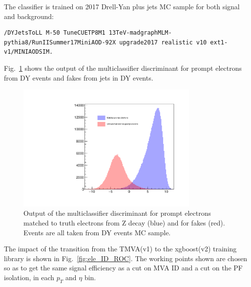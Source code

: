 The classifier is trained on 2017 Drell-Yan plus jets MC sample for both signal and background:
{
\tiny
\begin{verbatim}
/DYJetsToLL M-50 TuneCUETP8M1 13TeV-madgraphMLM-pythia8/RunIISummer17MiniAOD-92X upgrade2017 realistic v10 ext1-v1/MINIAODSIM.
\end{verbatim}
}

Fig.~\ref{fig:ele_ID_output} shows the output of the multiclassifier discriminant for prompt electrons from DY events and fakes from jets in DY events.

\begin{figure}[!htb]
\vspace*{0.3cm}
\begin{center}
\includegraphics[width=0.80\textwidth]{Figures/Electrons/Ele_BDTv2_Score.pdf}
\caption{Output of the multiclassifier discriminant for prompt electrons matched to truth electrons from Z decay (blue) and for fakes (red). Events are all taken from DY events MC sample.
\label{fig:ele_ID_output}}
\end{center}
\end{figure}

The impact of the transition from the TMVA(v1) to the xgboost(v2) training library is shown in Fig.~\ref{fig:ele_ID_ROC}.
The working points shown are chosen so as to get the  same signal efficiency as a cut on MVA ID and a cut on the PF isolation, in each $p_T$ and $\eta$ bin.


